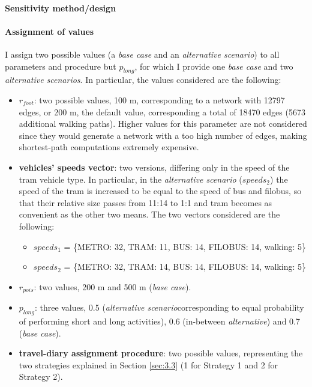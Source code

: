 \paragraph{Sensitivity method/design}


\paragraph{Assignment of values}
I assign two possible values (a \textit{base case} and an \textit{alternative scenario}) to all parameters and procedure but $p_{long}$, for which I provide one \textit{base case} and two \textit{alternative scenarios}. In particular, the values considered are the following:
\begin{itemize}
    \item \textbf{$r_{foot}$}: two possible values, 100 m, corresponding to a network with 12797 edges, or 200 m, the default value, corresponding a total of 18470 edges (5673 additional walking paths). Higher values for this parameter are not considered since they would generate a network with a too high number of edges, making shortest-path computations extremely expensive.
    \item \textbf{vehicles' speeds vector}: two versions, differing only in the speed of the tram vehicle type. In particular, in the \textit{alternative scenario} ($speeds_2$) the speed of the tram is increased to be equal to the speed of bus and filobus, so that their relative size passes from 11:14 to 1:1 and tram becomes as convenient as the other two means. The two vectors considered are the following:
            \begin{itemize}
                \item $speeds_1$ = \{METRO: 32, TRAM: 11, BUS: 14, FILOBUS: 14, walking: 5\}
                \item $speeds_2$ = \{METRO: 32, TRAM: 14, BUS: 14, FILOBUS: 14, walking: 5\}
            \end{itemize}
    \item \textbf{$r_{pois}$}: two values, 200 m and 500 m (\textit{base case}). 
    \item \textbf{$p_{long}$}: three values, 0.5 (\textit{alternative scenario}corresponding to equal probability of performing short and long activities), 0.6 (in-between \textit{alternative}) and 0.7 (\textit{base case}).
    \item \textbf{travel-diary assignment procedure}: two possible values, representing the two strategies explained in Section \ref{sec:3.3} (1 for Strategy 1 and 2 for Strategy 2).
\end{itemize}

